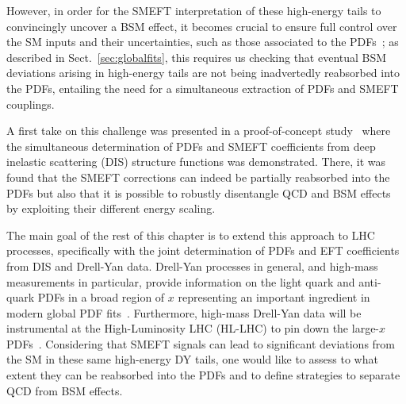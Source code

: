 \documentclass[withindex,glossary]{cam-thesis}
\begin{document}
However, in order for the SMEFT interpretation of these high-energy tails
to convincingly uncover a BSM effect, it becomes crucial to ensure
full control over the SM inputs and their
uncertainties, such as those associated to the PDFs~\cite{Gao:2017yyd};
as described in Sect.~\ref{sec:globalfits}, this requires us checking that
eventual BSM deviations arising in high-energy tails are not being
inadvertedly reabsorbed into the PDFs, entailing the need for a simultaneous
extraction of PDFs and SMEFT couplings.

A first take on this challenge was presented in a proof-of-concept study~\cite{Carrazza:2019sec} where
the simultaneous determination of PDFs and SMEFT coefficients from deep inelastic scattering (DIS)
structure functions was demonstrated.
%
There, it was found that the SMEFT corrections can indeed be partially reabsorbed into the PDFs
but also that it is possible to robustly disentangle
QCD and BSM effects by exploiting their different energy scaling.

The main goal of the rest of this chapter is to extend this approach to LHC processes, specifically with the
joint determination of PDFs and EFT coefficients from DIS and Drell-Yan data.
%
Drell-Yan processes in general, and high-mass measurements in particular,
provide information on the light quark and anti-quark PDFs in a broad region of $x$ representing
an important ingredient in modern global PDF fits~\cite{Ball:2014uwa,Ball:2017nwa,Hou:2019efy,Bailey:2020ooq}.
%
Furthermore, high-mass Drell-Yan data will be instrumental at the High-Luminosity LHC (HL-LHC)
to pin down the large-$x$ PDFs~\cite{Khalek:2018mdn}.
%
Considering that SMEFT signals can lead to significant deviations from the SM
in these same high-energy DY tails, one would like to assess to what extent they
can be reabsorbed into the PDFs and to define strategies to
separate QCD from BSM effects.
\end{document}

